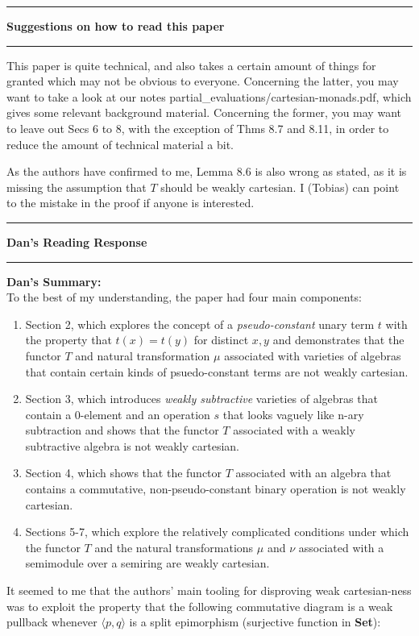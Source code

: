 \documentclass{amsart}
\newcommand{\iam}[1]{
  \vspace{0.25em}
  \hrule
  \vspace{0.25em}
  \textbf{{#1}'s Reading Response}
  \vspace{0.25em}
  \hrule
  \vspace{1em}
}
\begin{document}
{
  \vspace{0.25em}
  \hrule
  \vspace{0.25em}
  \Large{\textbf{Suggestions on how to read this paper}}
  \vspace{0.25em}
  \hrule
  \vspace{1em}
}


This paper is quite technical, and also takes a certain amount of things
for granted which may not be obvious to everyone. Concerning the latter,
you may want to take a look at our notes
partial\_evaluations/cartesian-monads.pdf, which gives some
relevant background material. Concerning the former, you may want to
leave out Secs 6 to 8, with the exception of Thms 8.7 and 8.11, in order
to reduce the amount of technical material a bit.

As the authors have confirmed to me, Lemma 8.6 is also wrong as stated, as it is missing the assumption that $T$ should be weakly cartesian. I (Tobias) can point to the mistake in the proof if anyone is interested.


\iam{Dan}

\textbf{Dan's Summary:}\\
To the best of my understanding, the paper had four main components:
\begin{enumerate}
  \item Section 2, which explores the concept of a \textit{pseudo-constant} unary term $t$ with the property that $t(x) = t(y)$ for distinct $x,y$ and demonstrates that the functor $T$ and natural transformation $\mu$ associated with varieties of algebras that contain certain kinds of psuedo-constant terms are not weakly cartesian.
  \item Section 3, which introduces \textit{weakly subtractive} varieties of algebras that contain a $0$-element and an operation $s$ that looks vaguely like n-ary subtraction and shows that the functor $T$ associated with a weakly subtractive algebra is not weakly cartesian.
  \item Section 4, which shows that the functor $T$ associated with an algebra that contains a commutative, non-pseudo-constant binary operation is not weakly cartesian.
  \item Sections 5-7, which explore the relatively complicated conditions under which the functor $T$ and the natural transformations $\mu$ and $\nu$ associated with a semimodule over a semiring are weakly cartesian.
\end{enumerate}

It seemed to me that the authors' main tooling for disproving weak cartesian-ness was to exploit the property that the following commutative diagram is a weak pullback whenever $\langle {p,q} \rangle$ is a split epimorphism (surjective function in \textbf{Set}):
\end{document}
